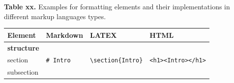\documentclass[10pt,fleqn]{wlpeerj}
\begin{document}
\textbf{Table
xx.}
Examples
for
formatting
elements
and
their
implementations
in
different
markup
languages
types.

\begin{longtable}[]{@{}llll@{}}
\toprule
\begin{minipage}[b]{0.20\columnwidth}\raggedright\strut
\textbf{Element}\strut
\end{minipage}
&
\begin{minipage}[b]{0.18\columnwidth}\raggedright\strut
\textbf{Markdown}\strut
\end{minipage}
&
\begin{minipage}[b]{0.25\columnwidth}\raggedright\strut
\textbf{LATEX}\strut
\end{minipage}
&
\begin{minipage}[b]{0.26\columnwidth}\raggedright\strut
\textbf{HTML}\strut
\end{minipage}\tabularnewline
\midrule
\endhead
\begin{minipage}[t]{0.20\columnwidth}\raggedright\strut
\textbf{structure}\strut
\end{minipage}
&
\begin{minipage}[t]{0.18\columnwidth}\raggedright\strut
\strut
\end{minipage}
&
\begin{minipage}[t]{0.25\columnwidth}\raggedright\strut
\strut
\end{minipage}
&
\begin{minipage}[t]{0.26\columnwidth}\raggedright\strut
\strut
\end{minipage}\tabularnewline
\begin{minipage}[t]{0.20\columnwidth}\raggedright\strut
section\strut
\end{minipage}
&
\begin{minipage}[t]{0.18\columnwidth}\raggedright\strut
\texttt{\#\ Intro}\strut
\end{minipage}
&
\begin{minipage}[t]{0.25\columnwidth}\raggedright\strut
\texttt{\textbackslash{}section\{Intro\}}\strut
\end{minipage}
&
\begin{minipage}[t]{0.26\columnwidth}\raggedright\strut
\texttt{\textless{}h1\textgreater{}\textless{}Intro\textgreater{}\textless{}/h1\textgreater{}}\strut
\end{minipage}\tabularnewline
\begin{minipage}[t]{0.20\columnwidth}\raggedright\strut
subsection\strut
\end{minipage}

\end{longtable}
\end{document}
